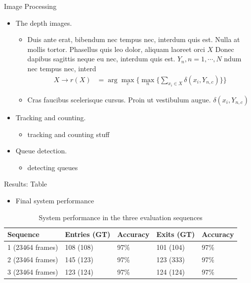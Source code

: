 \documentclass[final,hyperref={pdfpagelabels=false}]{beamer}
\begin{document}
\begin{frame}[t]
\begin{columns}[t]
\begin{column}{.465\textwidth}
\begin{block}{Image Processing}

\begin{itemize}
\item The depth images.
\begin{itemize}
\item Duis ante erat, bibendum nec tempus nec, interdum quis est. Nulla at mollis tortor. Phasellus quis leo dolor, aliquam laoreet orci $X$ Donec dapibus sagittis neque eu nec, interdum quis est. $Y_n, n=1,\cdots,N$ ndum nec tempus nec, interd
\begin{align*}
X \rightarrow r(X) & = \arg \max_{c} \Big\{ \max_n \big\{ \sum_{x_i \in X} \delta(x_i,Y_{n,c})\big\} \Big\} 
\end{align*}
\item Cras faucibus scelerisque cursus. Proin ut vestibulum augue. $\delta(x_i,Y_{n,c})$
\end{itemize}
\item Tracking and counting.
\begin{itemize}
\item{tracking and counting stuff}
\end{itemize}
\item Queue detection.
\begin{itemize}
\item{detecting queues}
\end{itemize}
\end{itemize}

\end{block}





\begin{block}{Results: Table}

\begin{itemize}
\item Final system performance
\end{itemize}

\begin{table}
\begin{tabular}{l l l l l}
\toprule
\textbf{Sequence} & \textbf{Entries (GT)} & \textbf{Accuracy} & \textbf{Exits (GT)} & \textbf{Accuracy}\\
\midrule
1 (23464 frames) & 108 (108) & 97\% & 101 (104) & 97\% \\
2 (23464 frames) & 145 (123) & 97\% & 123 (333) & 97\% \\
3 (23464 frames) & 123 (124) & 97\% & 124 (124) & 97\% \\
\bottomrule
\end{tabular}
\caption{System performance in the three evaluation sequences}
\end{table}



\end{block}
\end{column}
\end{columns}
\end{frame}
\end{document}

